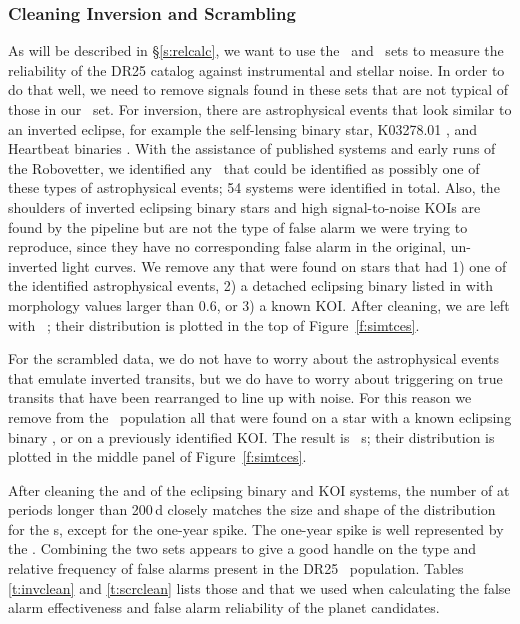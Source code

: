 \subsubsection{Cleaning Inversion and Scrambling}
\label{s:clean}
As will be described in \S\ref{s:relcalc}, we want to use the \invtce\ and \scrtce\ sets to measure the reliability of the DR25 catalog against instrumental and stellar noise. In order to do that well, we need to remove signals found in these sets that are not typical of those in our \opstce\ set. For inversion, there are astrophysical events that look similar to an inverted eclipse, for example the self-lensing binary star, K03278.01 \citep{Kruse2014}, and Heartbeat binaries \citep{Thompson2012}. With the assistance of published systems and early runs of the Robovetter, we identified any \invtce\ that could be identified as possibly one of these types of astrophysical events; 54 systems were identified in total. Also, the shoulders of inverted eclipsing binary stars and high signal-to-noise KOIs are found by the pipeline but are not the type of false alarm we were trying to reproduce, since they have no corresponding false alarm in the original, un-inverted light curves. We remove any  that were found on stars that had 1) one of the identified astrophysical events, 2) a detached eclipsing binary listed in \citet{Kirk2016} with morphology values larger than 0.6, or 3) a known KOI.  After cleaning, we are left with \ninvtces\ ; their distribution is plotted in the top of Figure~\ref{f:simtces}.

For the scrambled data, we do not have to worry about the astrophysical events that emulate inverted transits, but we do have to worry about triggering on true transits that have been rearranged to line up with noise. For this reason we remove from the \scrtce\ population all that were found on a star with a known eclipsing binary \citep{Kirk2016}, or on a previously identified KOI. The result is \nscrtces\ \scrtce s; their distribution is plotted in the middle panel of Figure~\ref{f:simtces}. 

After cleaning the  and  of the eclipsing binary and KOI systems, the number of  at periods longer than 200\,d closely matches the size and shape of the distribution for the \opstce s, except for the one-year spike. The one-year spike is well represented by the .  Combining the two sets appears to give a good handle on the type and relative frequency of false alarms present in the DR25 \opstce\ population. Tables\,\ref{t:invclean} and \ref{t:scrclean} lists those  and  that we used when calculating the false alarm effectiveness and false alarm reliability of the planet candidates.




